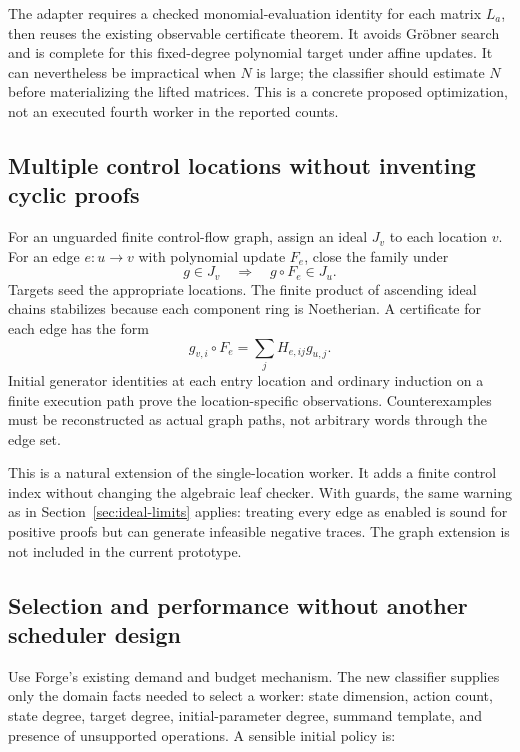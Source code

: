 The adapter requires a checked monomial-evaluation identity for each matrix
$L_a$, then reuses the existing observable certificate theorem. It avoids
Gr\"obner search and is complete for this fixed-degree polynomial target under
affine updates. It can nevertheless be impractical when $N$ is large; the
classifier should estimate $N$ before materializing the lifted matrices. This
is a concrete proposed optimization, not an executed fourth worker in the
reported counts.

\subsection{Multiple control locations without inventing cyclic proofs}

For an unguarded finite control-flow graph, assign an ideal $J_v$ to each
location $v$. For an edge $e:u\to v$ with polynomial update $F_e$, close the
family under
\[
 g\in J_v\quad\Longrightarrow\quad g\circ F_e\in J_u.
\]
Targets seed the appropriate locations. The finite product of ascending ideal
chains stabilizes because each component ring is Noetherian. A certificate for
each edge has the form
\[
 g_{v,i}\circ F_e=\sum_j H_{e,ij}g_{u,j}.
\]
Initial generator identities at each entry location and ordinary induction on a
finite execution path prove the location-specific observations. Counterexamples
must be reconstructed as actual graph paths, not arbitrary words through the
edge set.

This is a natural extension of the single-location worker. It adds a finite
control index without changing the algebraic leaf checker. With guards, the
same warning as in Section~\ref{sec:ideal-limits} applies: treating every edge
as enabled is sound for positive proofs but can generate infeasible negative
traces. The graph extension is not included in the current prototype.

\subsection{Selection and performance without another scheduler design}

Use Forge's existing demand and budget mechanism. The new classifier supplies
only the domain facts needed to select a worker: state dimension, action count,
state degree, target degree, initial-parameter degree, summand template, and
presence of unsupported operations. A sensible initial policy is:

